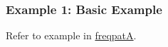 \subsubsection*{Example 1: Basic Example}

Refer to example in \hyperref[sect:freqpatA]{freqpatA}.

